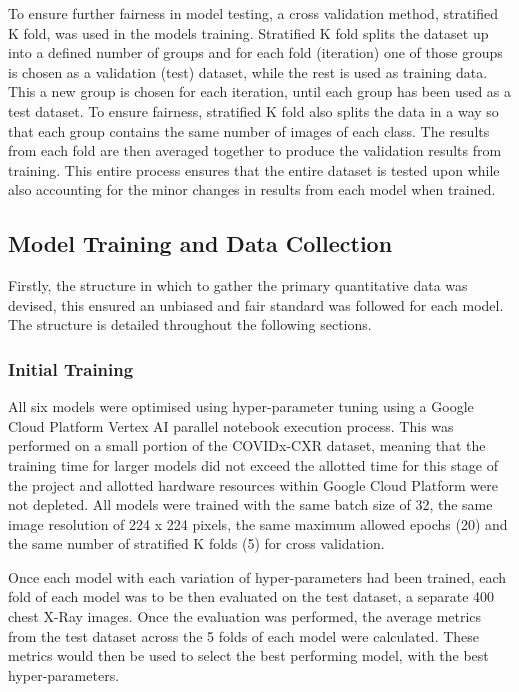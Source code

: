 To ensure further fairness in model testing, a cross validation method, stratified K fold, was used in the models training. Stratified K fold splits the dataset up into a defined number of groups and for each fold (iteration) one of those groups is chosen as a validation (test) dataset, while the rest is used as training data. This a new group is chosen for each iteration, until each group has been used as a test dataset. To ensure fairness, stratified K fold also splits the data in a way so that each group contains the same number of images of each class. The results from each fold are then averaged together to produce the validation results from training. This entire process ensures that the entire dataset is tested upon while also accounting for the minor changes in results from each model when trained.

\subsection{Model Training and Data Collection}
Firstly, the structure in which to gather the primary quantitative data was devised, this ensured an unbiased and fair standard was followed for each model. The structure is detailed throughout the following sections.


\subsubsection{Initial Training}
All six models were optimised using hyper-parameter tuning using a Google Cloud Platform Vertex AI parallel notebook execution process. This was performed on a small portion of the COVIDx-CXR dataset, meaning that the training time for larger models did not exceed the allotted time for this stage of the project and allotted hardware resources within Google Cloud Platform were not depleted. All models were trained with the same batch size of 32, the same image resolution of 224 x 224 pixels, the same maximum allowed epochs (20) and the same number of stratified K folds (5) for cross validation.

Once each model with each variation of hyper-parameters had been trained, each fold of each model was to be then evaluated on the test dataset, a separate 400 chest X-Ray images. Once the evaluation was performed, the average metrics from the test dataset across the 5 folds of each model were calculated. These metrics would then be used to select the best performing model, with the best hyper-parameters.

